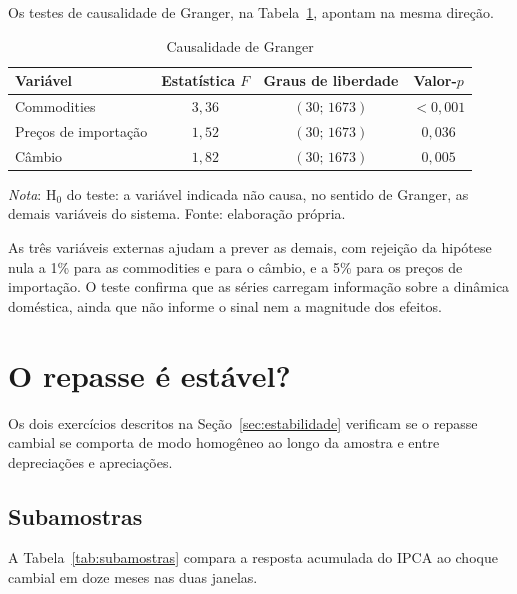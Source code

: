 \documentclass[12pt,openright,oneside,a4paper,portuguese,brazil]{abntex2}
\begin{document}
Os testes de causalidade de Granger, na Tabela~\ref{tab:granger}, apontam na
mesma direção.

\begin{table}[htbp]
\centering
\caption{Causalidade de Granger}
\label{tab:granger}
\footnotesize
\begin{tabular}{lccc}
\toprule
Variável & Estatística $F$ & Graus de liberdade & Valor-$p$ \\
\midrule
Commodities            & $3{,}36$ & $(30;\,1673)$ & $<0{,}001$ \\
Preços de importação   & $1{,}52$ & $(30;\,1673)$ & $0{,}036$ \\
Câmbio                 & $1{,}82$ & $(30;\,1673)$ & $0{,}005$ \\
\bottomrule
\end{tabular}

\vspace{2pt}
\begin{flushleft}\footnotesize
\textit{Nota}: H$_0$ do teste: a variável indicada não causa, no sentido de
Granger, as demais variáveis do sistema. Fonte: elaboração própria.
\end{flushleft}
\end{table}

As três variáveis externas ajudam a prever as demais, com rejeição da hipótese
nula a 1\% para as commodities e para o câmbio, e a 5\% para os preços de
importação. O teste confirma que as séries carregam informação sobre a dinâmica
doméstica, ainda que não informe o sinal nem a magnitude dos efeitos.

\section{O repasse é estável?}
\label{sec:resultadoestabilidade}

Os dois exercícios descritos na Seção~\ref{sec:estabilidade} verificam se o
repasse cambial se comporta de modo homogêneo ao longo da amostra e entre
depreciações e apreciações.

\subsection{Subamostras}

A Tabela~\ref{tab:subamostras} compara a resposta acumulada do IPCA ao choque
cambial em doze meses nas duas janelas.
\end{document}

